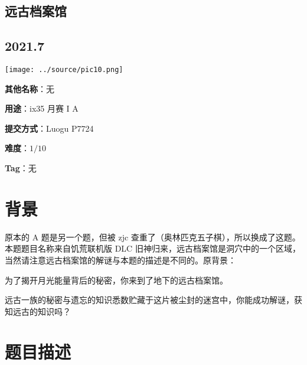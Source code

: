 \documentclass[a4paper,10pt]{article}
\begin{document}
\vspace*{\fill}
\begin{center}

\section{远古档案馆}

\subsection*{2021.7}

\vspace{10pt}

\texttt{[image: ../source/pic10.png]}

\vspace{10pt}

\textbf{其他名称}：无

\vspace{10pt}

\textbf{用途}：ix35 月赛 I A

\vspace{10pt}

\textbf{提交方式}：Luogu P7724

\vspace{10pt}

\textbf{难度}：$1/10$

\vspace{10pt}

\textbf{Tag}：无

\end{center}
\vspace*{\fill}

\newpage

\section*{背景}

原本的 A 题是另一个题，但被 zjc 查重了（奥林匹克五子棋），所以换成了这题。本题题目名称来自饥荒联机版 DLC 旧神归来，远古档案馆是洞穴中的一个区域，当然请注意远古档案馆的解谜与本题的描述是不同的。原背景：

为了揭开月光能量背后的秘密，你来到了地下的远古档案馆。

远古一族的秘密与遗忘的知识悉数贮藏于这片被尘封的迷宫中，你能成功解谜，获知远古的知识吗？

\section*{题目描述}
\end{document}
